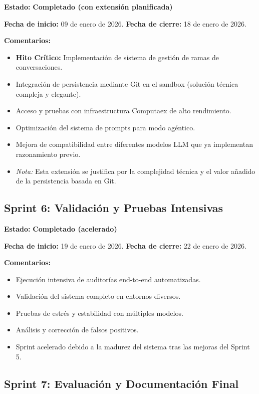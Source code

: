 \documentclass[12pt,a4paper]{article}
\begin{document}
\textbf{Estado:} \textcolor{late}{\textbf{Completado (con extensión planificada)}}

\textbf{Fecha de inicio:} 09 de enero de 2026.
\textbf{Fecha de cierre:} 18 de enero de 2026.

\textbf{Comentarios:}
\begin{itemize}
    \item \textbf{Hito Crítico:} Implementación de sistema de gestión de ramas de conversaciones.
    \item Integración de persistencia mediante Git en el sandbox (solución técnica compleja y elegante).
    \item Acceso y pruebas con infraestructura Computaex de alto rendimiento.
    \item Optimización del sistema de prompts para modo agéntico.
    \item Mejora de compatibilidad entre diferentes modelos LLM que ya implementan razonamiento previo.
    \item \textit{Nota:} Esta extensión se justifica por la complejidad técnica y el valor añadido de la persistencia basada en Git.
\end{itemize}

\subsection{Sprint 6: Validación y Pruebas Intensivas}

\textbf{Estado:} \textcolor{early}{\textbf{Completado (acelerado)}}

\textbf{Fecha de inicio:} 19 de enero de 2026.
\textbf{Fecha de cierre:} 22 de enero de 2026.

\textbf{Comentarios:}
\begin{itemize}
    \item Ejecución intensiva de auditorías end-to-end automatizadas.
    \item Validación del sistema completo en entornos diversos.
    \item Pruebas de estrés y estabilidad con múltiples modelos.
    \item Análisis y corrección de falsos positivos.
    \item Sprint acelerado debido a la madurez del sistema tras las mejoras del Sprint 5.
\end{itemize}

\subsection{Sprint 7: Evaluación y Documentación Final}
\end{document}
